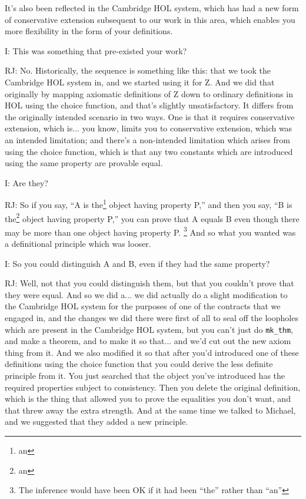 \documentclass[10pt,titlepage]{book}
\begin{document}
It's also been reflected in the Cambridge HOL system, which has had a new form of conservative extension subsequent to our work in this area, which enables you more flexibility in the form of your definitions.

I: This was something that pre-existed your work?

RJ: No.
Historically, the sequence is something like this: that we took the Cambridge HOL system in, and we started using it for Z.
And we did that originally by mapping axiomatic definitions of Z down to ordinary definitions in HOL using the choice function, and that's slightly unsatisfactory.
It differs from the originally intended scenario in two ways.
One is that it requires conservative extension, which is... you know, limits you to conservative extension, which was an intended limitation; and there's a non-intended limitation which arises from using the choice function, which is that any two constants which are introduced using the same property are provable equal.

I: Are they?

RJ: So if you say, ``A is the\footnote{an} object having property P,'' and then you say, ``B is the\footnote{an} object having property P,'' you can prove that A equals B even though there may be more than one object having property P.%
\footnote{The inference would have been OK if it had been ``the'' rather than ``an''}
And so what you wanted was a definitional principle which was looser.

I: So you could distinguish A and B, even if they had the same property?

RJ: Well, not that you could distinguish them, but that you couldn't prove that they were equal.
And so we did a... we did actually do a slight modification to the Cambridge HOL system for the purposes of one of the contracts that we engaged in, and the changes we did there were first of all to seal off the loopholes which are present in the Cambridge HOL system, but you can't just do {\tt mk\_thm}, and make a theorem, and to make it so that... and we'd cut out the new axiom thing from it. And we also modified it so that after you'd introduced one of these definitions using the choice function that you could derive the less definite principle from it. You just searched that the object you've introduced has the required properties subject to consistency. Then you delete the original definition, which is the thing that allowed you to prove the equalities you don't want, and that threw away the extra strength.
And at the same time we talked to Michael, and we suggested that they added a new principle.
\end{document}

